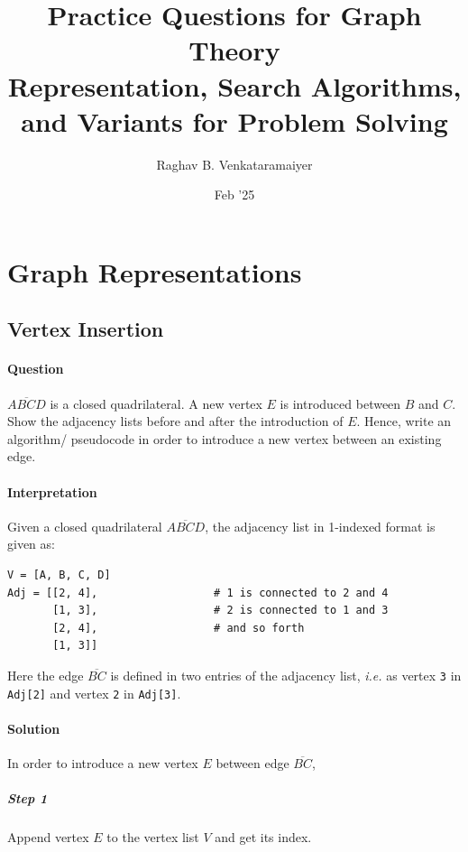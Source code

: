 \documentclass[11pt]{article}
\author{Raghav B. Venkataramaiyer}
\date{Feb '25}
\title{Practice Questions for Graph Theory\\\medskip
\large Representation, Search Algorithms, and Variants for Problem Solving}
\begin{document}
\maketitle

\section{Graph Representations}
\label{sec:org26d5fc6}

\subsection{Vertex Insertion}
\label{sec:org5d963ae}
\paragraph*{Question}
\label{sec:orgb4a887b}

\(\overline{\mathit{ABCD}}\) is a closed quadrilateral.
A new vertex \(E\) is introduced between \(B\) and \(C\).
Show the adjacency lists before and after the
introduction of \(E\).  Hence, write an algorithm/
pseudocode in order to introduce a new vertex between
an existing edge.

\paragraph*{Interpretation}
\label{sec:orgad54504}
Given a closed quadrilateral
\(\overline{\mathit{ABCD}}\), the adjacency list in
1-indexed format is given as:

\begin{verbatim}
V = [A, B, C, D]
Adj = [[2, 4],                  # 1 is connected to 2 and 4
       [1, 3],                  # 2 is connected to 1 and 3
       [2, 4],                  # and so forth
       [1, 3]]
\end{verbatim}

Here the edge \(\overline{\mathit{BC}}\) is defined in
two entries of the adjacency list, \emph{i.e.} as vertex \texttt{3}
in \texttt{Adj[2]} and vertex \texttt{2} in \texttt{Adj[3]}.

\paragraph*{Solution}
\label{sec:org677ea84}

In order to introduce a new vertex \(E\) between edge
\(\overline{\mathit{BC}}\),

\subparagraph*{Step 1}
\label{sec:orga8db44c}
Append vertex \(E\) to the vertex list \(V\) and get its
index.
\end{document}
